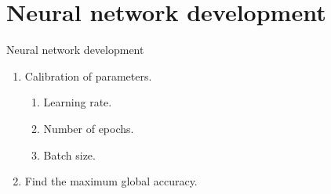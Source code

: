 \documentclass{beamer}
\begin{document}
\section{Neural network development}

\begin{frame}[fragile]{Neural network development}
 \begin{enumerate}
  \item<+-> Calibration of parameters.
        \begin{enumerate}
         \item<+-> Learning rate.
         \item<+-> Number of epochs.
         \item<+-> Batch size.
        \end{enumerate}
  \item<+-> Find the maximum global accuracy.
 \end{enumerate}
\end{frame}
\end{document}
